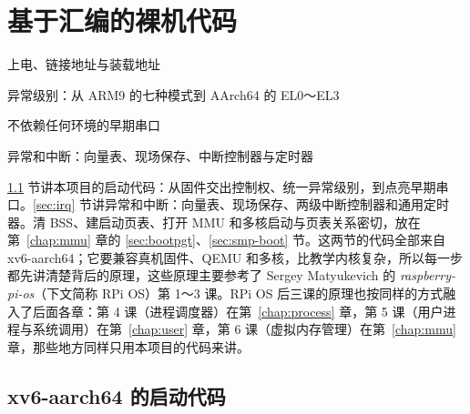 \chapter{基于汇编的裸机代码}
\label{chap:boot}
\setcounter{secnumdepth}{3}

\begin{introduction}[本章内容]
  \item 上电、链接地址与装载地址
  \item 异常级别：从 ARM9 的七种模式到 AArch64 的 EL0～EL3
  \item 不依赖任何环境的早期串口
  \item 异常和中断：向量表、现场保存、中断控制器与定时器
\end{introduction}

\ref{sec:xv6-startup} 节讲本项目的启动代码：从固件交出控制权、统一异常级别，到点亮早期串口。\ref{sec:irq} 节讲异常和中断：向量表、现场保存、两级中断控制器和通用定时器。清 BSS、建启动页表、打开 MMU 和多核启动与页表关系密切，放在第~\ref{chap:mmu} 章的 \ref{sec:bootpgt}、\ref{sec:smp-boot} 节。这两节的代码全部来自 xv6-aarch64；它要兼容真机固件、QEMU 和多核，比教学内核复杂，所以每一步都先讲清楚背后的原理，这些原理主要参考了 Sergey Matyukevich 的 \emph{raspberry-pi-os}\cite{rpios}（下文简称 RPi OS）第 1～3 课。RPi OS 后三课的原理也按同样的方式融入了后面各章：第 4 课（进程调度器）在第~\ref{chap:process} 章，第 5 课（用户进程与系统调用）在第~\ref{chap:user} 章，第 6 课（虚拟内存管理）在第~\ref{chap:mmu} 章，那些地方同样只用本项目的代码来讲。

\section{xv6-aarch64 的启动代码}
\label{sec:xv6-startup}




\setcounter{secnumdepth}{2}
